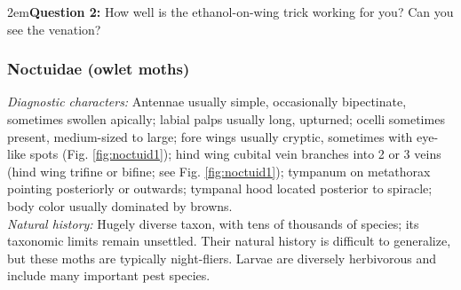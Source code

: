 \documentclass[letterpaper, 11pt]{article}
\begin{document}
\hangindent2em\textbf{Question 2:} How well is the ethanol-on-wing trick working for you? Can you see the venation?\\

\subsubsection{Noctuidae (owlet moths)}
\noindent{}\textit{Diagnostic characters:} Antennae usually simple, occasionally bipectinate, sometimes swollen apically; labial palps usually long, upturned; ocelli sometimes present, medium-sized to large; fore wings usually cryptic, sometimes with eye-like spots (Fig. \ref{fig:noctuid1}); hind wing cubital vein branches into 2 or 3 veins (hind wing trifine or bifine; see Fig. \ref{fig:noctuid1}); tympanum on metathorax pointing posteriorly or outwards; tympanal hood located posterior to spiracle; body color usually dominated by browns.\\

\noindent{}\textit{Natural history:} Hugely diverse taxon, with tens of thousands of species; its taxonomic limits remain unsettled. Their natural history is difficult to generalize, but these moths are typically night-fliers. Larvae are diversely herbivorous and include many important pest species.
\end{document}
